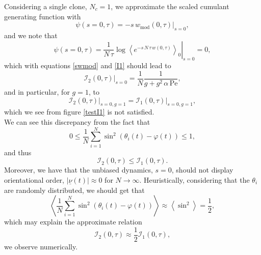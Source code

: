 \documentclass[10pt]{article}
\begin{document}
Considering a single clone, $N_c = 1$, we approximate the scaled cumulant generating function with
\begin{equation}
\psi(s=0, \tau) = \left. - s \, w_{\text{mod}}(0, \tau)\right|_{s=0},
\end{equation}
and we note that
\begin{equation}
\psi(s=0, \tau) = \left.\frac{1}{N \, \tau} \log\left<e^{-s \, N \, \tau \, w(0, \tau)}\right>_0\right|_{s=0} = 0,
\end{equation}
which with equations \ref{swmod} and \ref{I1} should lead to
\begin{equation}
\left. \mathcal{I}_2(0, \tau) \right|_{s=0} = \frac{1}{N} \frac{1}{g + g^2 \, \alpha \, \text{Pe}},
\end{equation}
and in particular, for $g = 1$, to
\begin{equation}
\left. \mathcal{I}_2(0, \tau) \right|_{s=0, g=1} = \left. \mathcal{I}_1(0, \tau) \right|_{s=0, g=1},
\end{equation}
which we see from figure \ref{testI1} is not satisfied.\\

We can see this discrepancy from the fact that
\begin{equation}
0 \leq \frac{1}{N} \sum_{i=1}^N \sin^2(\theta_i(t) - \varphi(t)) \leq 1,
\end{equation}
and thus
\begin{equation}
\mathcal{I}_2(0, \tau) \leq \mathcal{I}_1(0, \tau).
\end{equation}
Moreover, we have that the unbiased dynamics, $s = 0$, should not display orientational order, $|\underline{\nu}(t)| \approx 0$ for $N \rightarrow \infty$. Heuristically, considering that the $\theta_i$ are randomly distributed, we should get that
\begin{equation}
\left<\frac{1}{N} \sum_{i=1}^N \sin^2(\theta_i(t) - \varphi(t)) \right> \approx \left<\sin^2\right> = \frac{1}{2},
\end{equation}
which may explain the approximate relation
\begin{equation}
\mathcal{I}_2(0, \tau) \approx \frac{1}{2} \mathcal{I}_1(0, \tau),
\end{equation}
we observe numerically.
\end{document}
